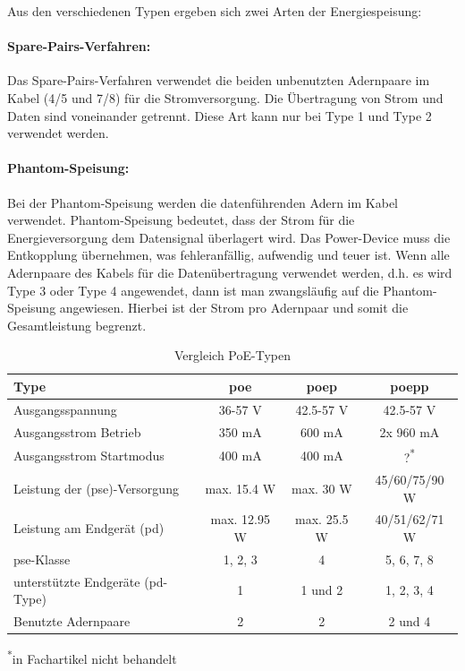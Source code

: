Aus den verschiedenen Typen ergeben sich zwei Arten der Energiespeisung:
\paragraph{Spare-Pairs-Verfahren:}
Das Spare-Pairs-Verfahren verwendet die beiden unbenutzten Adernpaare im Kabel (4/5 und 7/8) für die Stromversorgung. Die Übertragung von Strom und Daten sind voneinander getrennt. Diese Art kann nur bei Type 1 und Type 2 verwendet werden.

\paragraph{Phantom-Speisung:}
Bei der Phantom-Speisung werden die datenführenden Adern im Kabel verwendet. Phantom-Speisung bedeutet, dass der Strom für die Energieversorgung dem Datensignal überlagert wird. Das Power-Device muss die Entkopplung übernehmen, was fehleranfällig, aufwendig und teuer ist.
Wenn alle Adernpaare des Kabels für die Datenübertragung verwendet werden, d.h. es wird Type 3 oder Type 4 angewendet, dann ist man zwangsläufig auf die Phantom-Speisung angewiesen. Hierbei ist der Strom pro Adernpaar und somit die Gesamtleistung begrenzt.

\begin{table}[htbp!]
	\centering
	\begin{tabular}{lccc}
		\toprule
		Type & \acs{poe} & \acs{poep} & \acs{poepp} \\
		\midrule
		Ausgangsspannung & 36-57 V & 42.5-57 V & 42.5-57 V \\
		\midrule
		Ausgangsstrom Betrieb & 350 mA & 600 mA & 2x 960 mA \\
		\midrule
		Ausgangsstrom Startmodus & 400 mA & 400 mA & ?\textsuperscript{*} \\
		\midrule
		Leistung der (\acs{pse})-Versorgung & max. 15.4 W & max. 30 W & 45/60/75/90 W \\
		\midrule
		Leistung am Endgerät (\acs{pd}) & max. 12.95 W & max. 25.5 W & 40/51/62/71 W\\
		\midrule
		\acs{pse}-Klasse & 1, 2, 3 & 4 & 5, 6, 7, 8 \\
		\midrule
		unterstützte Endgeräte (\acs{pd}-Type) & 1 & 1 und 2 & 1, 2, 3, 4 \\
		\midrule
		Benutzte Adernpaare & 2 & 2 & 2 und 4 \\
		\bottomrule
	\end{tabular}\bigskip\par
	\textsuperscript{*}in Fachartikel  nicht behandelt
	\caption{Vergleich PoE-Typen \cite[vgl.][]{elektropraktiker-poe}}
	\label{tab:poe-types}
\end{table}

